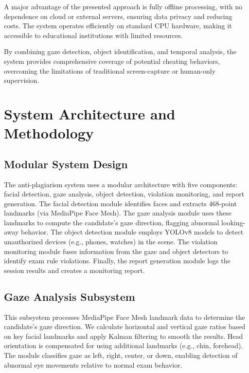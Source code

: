 \documentclass[conference]{IEEEtran}
\begin{document}
A major advantage of the presented approach is fully offline processing, with no dependence on cloud or external servers, ensuring data privacy and reducing costs. The system operates efficiently on standard CPU hardware, making it accessible to educational institutions with limited resources.

By combining gaze detection, object identification, and temporal analysis, the system provides comprehensive coverage of potential cheating behaviors, overcoming the limitations of traditional screen-capture or human-only supervision.

\section{System Architecture and Methodology}

\subsection{Modular System Design}

The anti-plagiarism system uses a modular architecture with five components: 
facial detection, gaze analysis, object detection, violation monitoring, and 
report generation. The facial detection module identifies faces and extracts 
468-point landmarks (via MediaPipe Face Mesh). The gaze analysis module 
uses these landmarks to compute the candidate's gaze direction, flagging 
abnormal looking-away behavior. The object detection module employs 
YOLOv8 models to detect unauthorized devices (e.g., phones, watches) in 
the scene. The violation monitoring module fuses information from the gaze 
and object detectors to identify exam rule violations. Finally, the report 
generation module logs the session results and creates a monitoring report.

\subsection{Gaze Analysis Subsystem}
This subsystem processes MediaPipe Face Mesh landmark data to determine 
the candidate’s gaze direction. We calculate horizontal and vertical gaze 
ratios based on key facial landmarks and apply Kalman filtering to smooth 
the results. Head orientation is compensated for using additional landmarks 
(e.g., chin, forehead). The module classifies gaze as left, right, center, or 
down, enabling detection of abnormal eye movements relative to normal 
exam behavior.
\end{document}
